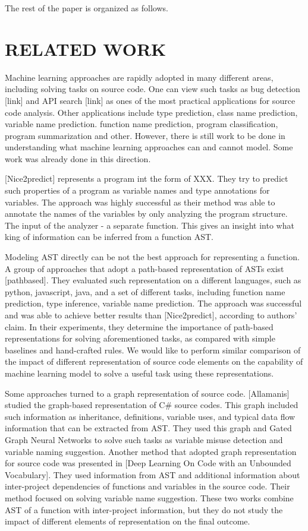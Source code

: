 \documentclass[a4paper,twoside]{article}
\begin{document}
The rest of the paper is organized as follows.

\section{\uppercase{Related Work}}

Machine learning approaches are rapidly adopted in many different areas, including solving tasks on source code. One can view such tasks as bug detection [link] and API search [link] as ones of the most practical applications for source code analysis. Other applications include type prediction, class name prediction, variable name prediction. function name prediction, program classification, program summarization and other.  However, there is still work to be done in understanding what machine learning approaches can and cannot model. Some work was already done in this direction. 

[Nice2predict] represents a program int the form of XXX. They try to predict such properties of a program as variable names and type annotations for variables. The approach was highly successful as their method was able to annotate the names of the variables by only analyzing the program structure. The input of the analyzer - a separate function. This gives an insight into what king of information can be inferred from a function AST.

Modeling AST directly can be not the best approach for representing a function. A group of approaches that adopt a path-based representation of ASTs exist [pathbased]. They evaluated such representation on a different languages, such as python, javascript, java, and a set of different tasks, including function name prediction, type inference, variable name prediction. The approach was successful and was able to achieve better results than [Nice2predict], according to authors' claim. In their experiments, they determine the importance of path-based representations for solving aforementioned tasks, as compared with simple baselines and hand-crafted rules. We would like to perform similar comparison of the impact of different representation of source code elements on the capability of machine learning model to solve a useful task using these representations.

Some approaches turned to a graph representation of source code. [Allamanis] studied the graph-based representation of C\# source codes. This graph included such information as inheritance, definitions, variable uses, and typical data flow information that can be extracted from AST. They used this graph and Gated Graph Neural Networks to solve such tasks as variable misuse detection and variable naming suggestion. Another method that adopted graph representation for source code was presented in [Deep Learning On Code with an Unbounded Vocabulary]. They used information from AST and additional information about inter-project dependencies of functions and variables in the source code. Their method focused on solving variable name suggestion. These two works combine AST of a function with inter-project information, but they do not study the impact of different elements of representation on the final outcome. 
\end{document}
